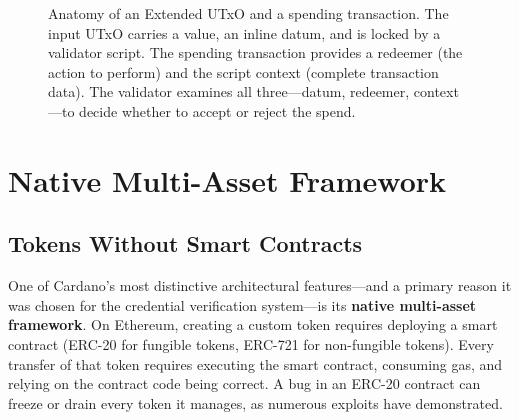\begin{figure}[htbp]
\caption{Anatomy of an Extended UTxO and a spending transaction. The input
UTxO carries a value, an inline datum, and is locked by a validator script.
The spending transaction provides a redeemer (the action to perform) and
the script context (complete transaction data). The validator examines all
three---datum, redeemer, context---to decide whether to accept or reject
the spend.}
\label{fig:eutxo-anatomy}
\end{figure}


\section{Native Multi-Asset Framework}
\label{sec:native-assets}

\subsection{Tokens Without Smart Contracts}

One of Cardano's most distinctive architectural features---and a primary
reason it was chosen for the credential verification system---is its
\textbf{native multi-asset framework}. On Ethereum, creating a custom
token requires deploying a smart contract (ERC-20 for fungible tokens,
ERC-721 for non-fungible tokens). Every transfer of that token requires
executing the smart contract, consuming gas, and relying on the contract
code being correct. A bug in an ERC-20 contract can freeze or drain
every token it manages, as numerous exploits have demonstrated.

